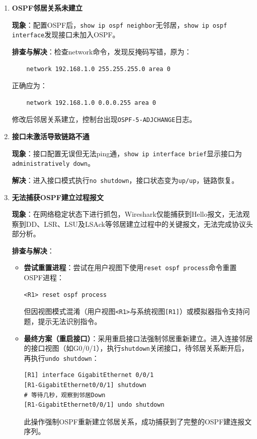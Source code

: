 \documentclass[a4paper]{article}
\begin{document}
\begin{enumerate}
    \item \textbf{OSPF邻居关系未建立}
    
    \textbf{现象}：配置OSPF后，\texttt{show ip ospf neighbor}无邻居，\texttt{show ip ospf interface}发现接口未加入OSPF。
    
    \textbf{排查与解决}：检查network命令，发现反掩码写错，原为：
    \begin{lstlisting}
    network 192.168.1.0 255.255.255.0 area 0
    \end{lstlisting}
    正确应为：
    \begin{lstlisting}
    network 192.168.1.0 0.0.0.255 area 0
    \end{lstlisting}
    修改后邻居关系建立，控制台出现\texttt{OSPF-5-ADJCHANGE}日志。
    
    \item \textbf{接口未激活导致链路不通}
    
    \textbf{现象}：接口配置无误但无法ping通，\texttt{show ip interface brief}显示接口为\texttt{administratively down}。
    
    \textbf{解决}：进入接口模式执行\texttt{no shutdown}，接口状态变为\texttt{up/up}，链路恢复。
    
    \item \textbf{无法捕获OSPF建立过程报文}
    
    \textbf{现象}：在网络稳定状态下进行抓包，Wireshark仅能捕获到Hello报文，无法观察到DD、LSR、LSU及LSAck等邻居建立过程中的关键报文，无法完成协议头部分析。
    
    \textbf{排查与解决}：
    \begin{itemize}
        \item \textbf{尝试重置进程}：尝试在用户视图下使用\texttt{reset ospf process}命令重置OSPF进程：
\begin{lstlisting}
<R1> reset ospf process
\end{lstlisting}
        但因视图模式混淆（用户视图\texttt{<R1>}与系统视图\texttt{[R1]}）或模拟器指令支持问题，提示无法识别指令。
        
        \item \textbf{最终方案（重启接口）}：采用重启接口法强制邻居重新建立。进入连接邻居的接口视图（如G0/0/1），执行\texttt{shutdown}关闭接口，待邻居关系断开后，再执行\texttt{undo shutdown}：
\begin{lstlisting}
[R1] interface GigabitEthernet 0/0/1
[R1-GigabitEthernet0/0/1] shutdown
# 等待几秒，观察到邻居Down
[R1-GigabitEthernet0/0/1] undo shutdown
\end{lstlisting}
        此操作强制OSPF重新建立邻居关系，成功捕获到了完整的OSPF建连报文序列。
    \end{itemize}
\end{enumerate}
\end{document}
